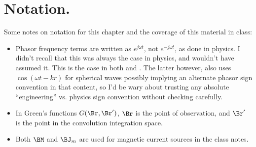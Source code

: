 %
%
\section{Notation.}
%
Some notes on notation for this chapter and the coverage of this material in class:
%
\begin{itemize}
\item Phasor frequency terms are written as \( e^{j \omega t} \), not \( e^{-j \omega t} \), as done in physics.  I didn't recall that this was always the case in physics, and wouldn't have assumed it.  This is the case in both \citep{jackson1975cew:simpleRadiating} and \citep{griffiths1999introduction:waves}.  The latter however, also uses \( \cos(\omega t - k r) \) for spherical waves possibly implying an alternate phasor sign convention in that content, so I'd be wary about trusting any absolute ``engineering'' vs. physics sign convention without checking carefully.
\item In Green's functions \( G(\Br, \Br') \), \( \Br \) is the point of observation, and \( \Br' \) is the point in the convolution integration space.
\item Both \( \BM \) and \( \BJ_m \) are used for magnetic current sources in the class notes.
\end{itemize}
